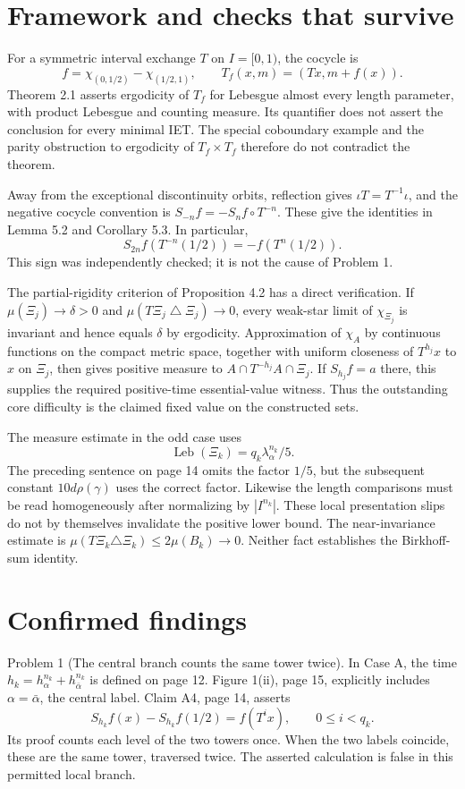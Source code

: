 \documentclass[10pt]{article}
\begin{document}
\section*{Framework and checks that survive}
For a symmetric interval exchange \(T\) on \(I=[0,1)\), the cocycle is \[f=\chi_{(0,1/2)}-\chi_{(1/2,1)},\qquad
 T_f(x,m)=(Tx,m+f(x)).\] Theorem 2.1 asserts ergodicity of \(T_f\) for Lebesgue almost every length parameter, with product Lebesgue and counting measure. Its quantifier does not assert the conclusion for every minimal IET. The special coboundary example and the parity obstruction to ergodicity of \(T_f\times T_f\) therefore do not contradict the theorem.\par
Away from the exceptional discontinuity orbits, reflection gives \(\iota T=T^{-1}\iota\), and the negative cocycle convention is \(S_{-n}f=-S_nf\circ T^{-n}\). These give the identities in Lemma 5.2 and Corollary 5.3. In particular, \[S_{2n}f(T^{-n}(1/2))=-f(T^n(1/2)).\] This sign was independently checked; it is not the cause of Problem 1.\par
The partial-rigidity criterion of Proposition 4.2 has a direct verification. If \(\mu(\Xi_j)\to\delta>0\) and \(\mu(T\Xi_j\mathbin{\triangle}\Xi_j)\to0\), every weak-star limit of \(\chi_{\Xi_j}\) is invariant and hence equals \(\delta\) by ergodicity. Approximation of \(\chi_A\) by continuous functions on the compact metric space, together with uniform closeness of \(T^{h_j}x\) to \(x\) on \(\Xi_j\), then gives positive measure to \(A\cap T^{-h_j}A\cap\Xi_j\). If \(S_{h_j}f=a\) there, this supplies the required positive-time essential-value witness. Thus the outstanding core difficulty is the claimed fixed value on the constructed sets.\par
The measure estimate in the odd case uses \[\mathop{\mathrm{Leb}}(\Xi_k)=q_k\lambda_\alpha^{n_k}/5.\] The preceding sentence on page 14 omits the factor \(1/5\), but the subsequent constant \(10d\rho(\gamma)\) uses the correct factor. Likewise the length comparisons must be read homogeneously after normalizing by \(|I^{n_k}|\). These local presentation slips do not by themselves invalidate the positive lower bound. The near-invariance estimate is \(\mu(T\Xi_k\triangle\Xi_k)\leq2\mu(B_k)\to0\). Neither fact establishes the Birkhoff-sum identity.\par
\section*{Confirmed findings}
Problem 1 (The central branch counts the same tower twice).  In Case A, the time \(h_k=h_\alpha^{n_k}+h_{\bar\alpha}^{n_k}\) is defined on page 12. Figure 1(ii), page 15, explicitly includes \(\alpha=\bar\alpha\), the central label. Claim A4, page 14, asserts \[S_{h_k}f(x)-S_{h_k}f(1/2)=f(T^ix),\qquad 0\leq i<q_k. \tag{A4}\] Its proof counts each level of the two towers once. When the two labels coincide, these are the same tower, traversed twice. The asserted calculation is false in this permitted local branch.\par
\end{document}
